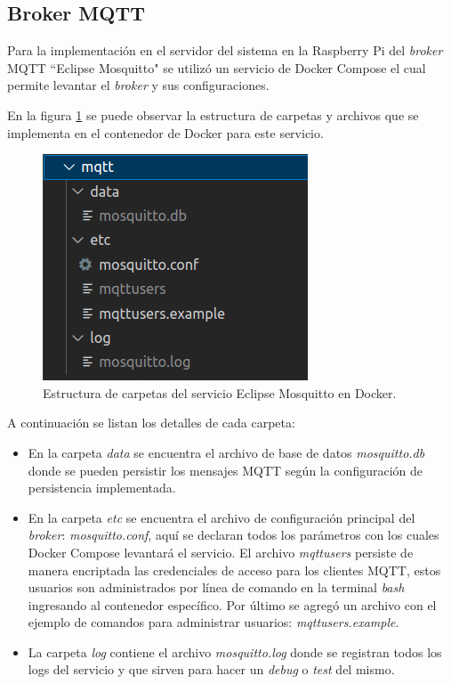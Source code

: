 \subsection{Broker MQTT}
\label{subsec:mqttbroker}

Para la implementación en el servidor del sistema en la Raspberry Pi del \textit{broker} MQTT ``Eclipse Mosquitto" se utilizó un servicio de Docker Compose el cual permite levantar el \textit{broker} y sus configuraciones.

En la figura \ref{fig:mqttestructuracarpetas} se puede observar la estructura de carpetas y archivos que se implementa en el contenedor de Docker para este servicio. 

\begin{figure}[H]
	\centering
	\includegraphics[scale=.60]{./Figures/mqtt-estructura-carpetas.png}
	\caption{Estructura de carpetas del servicio Eclipse Mosquitto en Docker.}
	\label{fig:mqttestructuracarpetas}
\end{figure}

A continuación se listan los detalles de cada carpeta:

\begin{itemize}
	\item En la carpeta \textit{data} se encuentra el archivo de base de datos \textit{mosquitto.db} donde se pueden persistir los mensajes MQTT según la configuración de persistencia implementada.
	\item En la carpeta \textit{etc} se encuentra el archivo de configuración principal del \textit{broker}: \textit{mosquitto.conf}, aquí se declaran todos los parámetros con los cuales Docker Compose levantará el servicio. El archivo \textit{mqttusers} persiste de manera encriptada las credenciales de acceso para los clientes MQTT, estos usuarios son administrados por línea de comando en la terminal \textit{bash} ingresando al contenedor específico. Por último se agregó un archivo con el ejemplo de comandos para administrar usuarios: \textit{mqttusers.example}.
	\item La carpeta \textit{log} contiene el archivo \textit{mosquitto.log} donde se registran todos los logs del servicio y que sirven para hacer un \textit{debug} o \textit{test} del mismo.	
\end{itemize}


